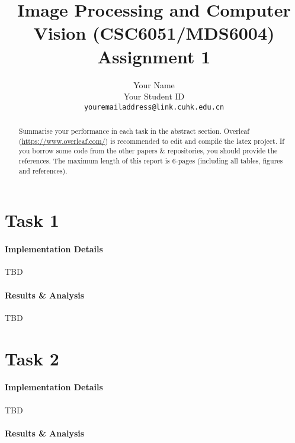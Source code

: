 \documentclass[final]{cvpr}
\begin{document}
\title{Image Processing and Computer Vision (CSC6051/MDS6004)  \\ Assignment 1}

\author{Your Name\\
Your Student ID\\
{\tt\small youremailaddress@link.cuhk.edu.cn}
}

\maketitle


\begin{abstract}
   Summarise your performance in each task in the abstract section. Overleaf (\url{https://www.overleaf.com/}) is recommended to edit and compile the latex project. If you borrow some code from the other papers \& repositories, you should provide the references. The maximum length of this report is 6-pages (including all tables, figures and references).
\end{abstract}

\section{Task 1}

\paragraph{Implementation Details}

TBD


\paragraph{Results \& Analysis}

TBD


\section{Task 2}

\paragraph{Implementation Details}

TBD


\paragraph{Results \& Analysis}
\end{document}
